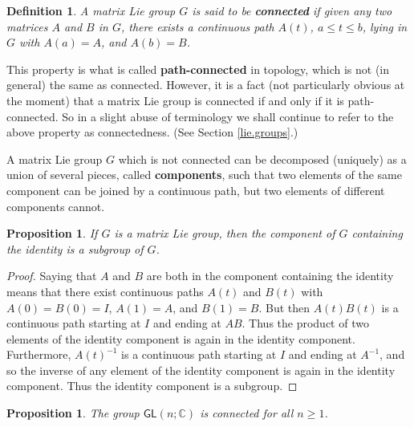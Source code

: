\documentclass[12pt]{amsbook}
\theoremstyle{plain}
\newtheorem{definition}[theorem]{Definition}
\newtheorem{proposition}[theorem]{Proposition}
\numberwithin{equation}{chapter}
\numberwithin{theorem}{chapter}
\begin{document}
\begin{definition}
\label{connectedness}A matrix Lie group $G$ is said to be \textbf{connected}
if given any two matrices $A$ and $B$ in $G$, there exists a continuous path
$A(t)$, $a\leq t\leq b$, lying in $G$ with $A(a)=A$, and $A(b)=B$.
\end{definition}

This property is what is called \textbf{path-connected} in topology, which is
not (in general) the same as connected. However, it is a fact (not
particularly obvious at the moment) that a matrix Lie group is connected if
and only if it is path-connected. So in a slight abuse of terminology we shall
continue to refer to the above property as connectedness. (See Section
\ref{lie.groups}.)

A matrix Lie group $G$ which is not connected can be decomposed (uniquely) as
a union of several pieces, called \textbf{components}, such that two elements
of the same component can be joined by a continuous path, but two elements of
different components cannot.

\begin{proposition}
If $G$ is a matrix Lie group, then the component of $G$ containing the
identity is a subgroup of $G$.
\end{proposition}

\begin{proof}
Saying that $A$ and $B$ are both in the component containing the identity
means that there exist continuous paths $A(t)$ and $B(t)$ with $A(0)=B(0)=I$,
$A(1)=A$, and $B(1)=B$. But then $A(t)B(t)$ is a continuous path starting at
$I$ and ending at $AB$. Thus the product of two elements of the identity
component is again in the identity component. Furthermore, $A(t)^{-1}$ is a
continuous path starting at $I$ and ending at $A^{-1}$, and so the inverse of
any element of the identity component is again in the identity component. Thus
the identity component is a subgroup.
\end{proof}

\begin{proposition}
The group $\mathsf{GL}(n;\mathbb{C})$ is connected for all $n\geq1$.
\end{proposition}
\end{document}
